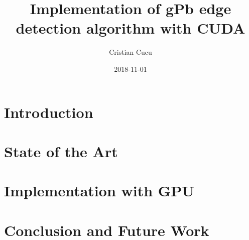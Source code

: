 \documentclass{article}
\title{Implementation of gPb edge detection algorithm with CUDA}
\date{2018-11-01}
\author{Cristian Cucu}
\begin{document}
\maketitle
\newpage
\lstset{language=C++}
\tableofcontents{}
\newpage

\section{Introduction}
\section{State of the Art}

\section{Implementation with GPU}

\section{Conclusion and Future Work}
\end{document}
